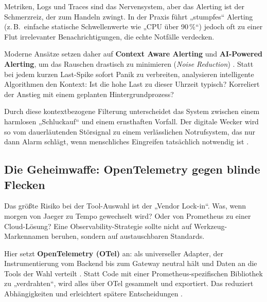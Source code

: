 Metriken, Logs und Traces sind das Nervensystem, aber das Alerting ist der Schmerzreiz, der zum Handeln zwingt. In der Praxis führt „stumpfes“ Alerting (z.\,B.\ einfache statische Schwellenwerte wie „CPU über 90\,\%“) jedoch oft zu einer Flut irrelevanter Benachrichtigungen, die echte Notfälle verdecken.

Moderne Ansätze setzen daher auf \textbf{Context Aware Alerting} und \textbf{AI-Powered Alerting}, um das Rauschen drastisch zu minimieren (\emph{Noise Reduction}) \cite{sakinala2025observability}. Statt bei jedem kurzen Last-Spike sofort Panik zu verbreiten, analysieren intelligente Algorithmen den Kontext: Ist die hohe Last zu dieser Uhrzeit typisch? Korreliert der Anstieg mit einem geplanten Hintergrundprozess? 

Durch diese kontextbezogene Filterung unterscheidet das System zwischen einem harmlosen „Schluckauf“ und einem ernsthaften Vorfall. Der digitale Wecker wird so vom dauerläutenden Störsignal zu einem verlässlichen Notrufsystem, das nur dann Alarm schlägt, wenn menschliches Eingreifen tatsächlich notwendig ist \cite{sakinala2025observability}.

\subsection{Die Geheimwaffe: OpenTelemetry gegen blinde Flecken}

Das größte Risiko bei der Tool-Auswahl ist der „Vendor Lock-in“. Was, wenn morgen von Jaeger zu Tempo gewechselt wird? Oder von Prometheus zu einer Cloud-Lösung? Eine Observability-Strategie sollte nicht auf Werkzeug-Markennamen beruhen, sondern auf austauschbaren Standards.

Hier setzt \textbf{OpenTelemetry (OTel)} an: als universeller Adapter, der Instrumentierung vom Backend bis zum Gateway neutral hält und Daten an die Tools der Wahl verteilt \cite{albuquerque2025tracing}. Statt Code mit einer Prometheus-spezifischen Bibliothek zu „verdrahten“, wird alles über OTel gesammelt und exportiert. Das reduziert Abhängigkeiten und erleichtert spätere Entscheidungen \cite{albuquerque2025tracing}.

